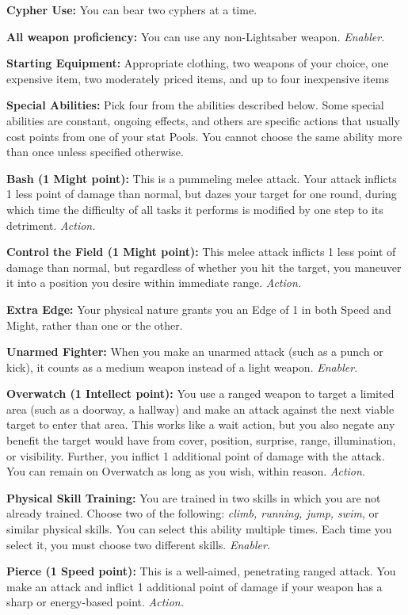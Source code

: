 \documentclass[a4paper,10pt,final,twocolumn,oneside]{book}
\newcommand{\itemLine}[2]{\textbf{#1:}{ #2}\par}
\newcommand{\itemAbility}[2]{\textcolor{25gray}{\textbullet\textbf{ #1:}}{ #2}\par}
\newcommand{\enabler}{\textit{ Enabler.}}
\newcommand{\action}{\textit{ Action.}}
\begin{document}
\itemLine{Cypher Use}{You can bear two cyphers at a time.}

\itemLine{All weapon proficiency}{You can use any non-Lightsaber weapon.\enabler}

\itemLine{Starting Equipment}{Appropriate clothing, two weapons of your choice, one expensive item, two moderately priced items, and up to four inexpensive items}

\itemLine{Special Abilities}{Pick four from the abilities described below. Some special abilities are constant, ongoing effects, and others are specific actions that usually cost points from one of your stat Pools. You cannot choose the same ability more than once unless specified otherwise.}

\itemAbility{Bash (1 Might point)}{This is a pummeling melee attack. Your attack inflicts 1 less point of damage than normal, but dazes your target for one round, during which time the difficulty of all tasks it performs is modified by one step to its detriment.\action}

\itemAbility{Control the Field (1 Might point)}{This melee attack inflicts 1 less point of damage than normal, but regardless of whether you hit the target, you maneuver it into a position you desire within immediate range.\action}

\itemAbility{Extra Edge}{Your physical nature grants you an Edge of 1 in both Speed and Might, rather than one or the other.}

\itemAbility{Unarmed Fighter}{When you make an unarmed attack (such as a punch or kick), it counts as a medium weapon instead of a light weapon.\enabler}

\itemAbility{Overwatch (1 Intellect point)}{You use a ranged weapon to target a limited area (such as a doorway, a hallway) and make an attack against the next viable target to enter that area. This works like a wait action, but you also negate any benefit the target would have from cover, position, surprise, range, illumination, or visibility. Further, you inflict 1 additional point of damage with the attack. You can remain on Overwatch as long as you wish, within reason.\action}

\itemAbility{Physical Skill Training}{You are trained in two skills in which you are not already trained. Choose two of the following: \textit{climb, running, jump, swim}, or similar physical skills. You can select this ability multiple times. Each time you select it, you must choose two different skills.\enabler}

\itemAbility{Pierce (1 Speed point)}{This is a well-aimed, penetrating ranged attack. You make an attack and inflict 1 additional point of damage if your weapon has a sharp or energy-based point.\action}
\end{document}

